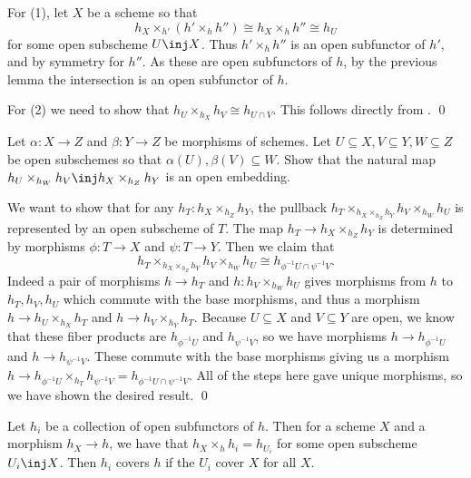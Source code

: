 \elemm

\bproof

    For (1), let $X$ be a scheme so that
    $$ h_X\times_{h'}(h'\times_hh'') \cong h_X\times_hh'' \cong h_U $$
    for some open subscheme $U\inj X$.
    Thus $h'\times_hh''$ is an open subfunctor of $h'$, and by symmetry for $h''$.
    As these are open subfunctors of $h$, by the previous lemma the intersection is an open subfunctor of $h$.

    For (2) we need to show that $h_U\times_{h_X}h_V\cong h_{U\cap V}$.
    This follows directly from .
    \qed

\eproof

\blemm[name={fiberopenisopen}]

    Let $\alpha\colon X\to Z$ and $\beta\colon Y\to Z$ be morphisms of schemes.
    Let $U\subseteq X,V\subseteq Y,W\subseteq Z$ be open subschemes so that $\alpha(U),\beta(V)\subseteq W$.
    Show that the natural map $h_U\times_{h_W}h_V\inj h_X\times_{h_Z}h_Y$ is an open embedding.

\elemm

\bproof

    We want to show that for any $h_T\colon h_X\times_{h_Z}h_Y$, the pullback
    $h_T\times_{h_X\times_{h_Z}h_Y}h_V\times_{h_W}h_U$ is represented by an open subscheme of $T$.
    The map $h_T\to h_X\times_{h_Z}h_Y$ is determined by morphisms $\phi\colon T\to X$ and
    $\psi\colon T\to Y$.
    Then we claim that
    $$ h_T\times_{h_X\times_{h_Z}h_Y}h_V\times_{h_W}h_U \cong h_{\phi^{-1}U\cap\psi^{-1}V} . $$
    Indeed a pair of morphisms $h\to h_T$ and $h\colon h_V\times_{h_W}h_U$ gives morphisms
    from $h$ to $h_T,h_V,h_U$ which commute with the base morphisms, and thus a morphism
    $h\to h_U\times_{h_X}h_T$ and $h\to h_V\times_{h_Y}h_T$.
    Because $U\subseteq X$ and $V\subseteq Y$ are open, we know that these fiber products are
    $h_{\phi^{-1}U}$ and $h_{\psi^{-1}V}$, so we have morphisms $h\to h_{\phi^{-1}U}$ and
    $h\to h_{\psi^{-1}V}$.
    These commute with the base morphisms giving us a morphism
    $h\to h_{\phi^{-1}U}\times_{h_T}h_{\psi^{-1}V}=h_{\phi^{-1}U\cap\psi^{-1}V}$.
    All of the steps here gave unique morphisms, so we have shown the desired result.
    \qed

\eproof

\bdefn

    Let $h_i$ be a collection of open subfunctors of $h$.
    Then for a scheme $X$ and a morphism $h_X\to h$, we have that $h_X\times_hh_i=h_{U_i}$ for some open
    subscheme $U_i\inj X$.
    Then $h_i$ {\emphcolor covers} $h$ if the $U_i$ cover $X$ for all $X$.

